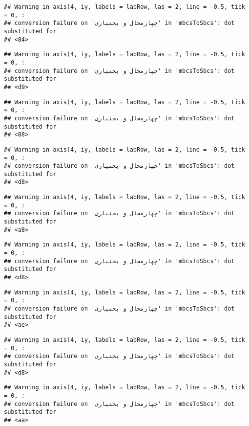 \documentclass[
]{article}
\begin{document}
\begin{verbatim}
## Warning in axis(4, iy, labels = labRow, las = 2, line = -0.5, tick = 0, :
## conversion failure on 'چهارمحال و بختیاری' in 'mbcsToSbcs': dot substituted for
## <84>
\end{verbatim}

\begin{verbatim}
## Warning in axis(4, iy, labels = labRow, las = 2, line = -0.5, tick = 0, :
## conversion failure on 'چهارمحال و بختیاری' in 'mbcsToSbcs': dot substituted for
## <d9>
\end{verbatim}

\begin{verbatim}
## Warning in axis(4, iy, labels = labRow, las = 2, line = -0.5, tick = 0, :
## conversion failure on 'چهارمحال و بختیاری' in 'mbcsToSbcs': dot substituted for
## <88>
\end{verbatim}

\begin{verbatim}
## Warning in axis(4, iy, labels = labRow, las = 2, line = -0.5, tick = 0, :
## conversion failure on 'چهارمحال و بختیاری' in 'mbcsToSbcs': dot substituted for
## <d8>
\end{verbatim}

\begin{verbatim}
## Warning in axis(4, iy, labels = labRow, las = 2, line = -0.5, tick = 0, :
## conversion failure on 'چهارمحال و بختیاری' in 'mbcsToSbcs': dot substituted for
## <a8>
\end{verbatim}

\begin{verbatim}
## Warning in axis(4, iy, labels = labRow, las = 2, line = -0.5, tick = 0, :
## conversion failure on 'چهارمحال و بختیاری' in 'mbcsToSbcs': dot substituted for
## <d8>
\end{verbatim}

\begin{verbatim}
## Warning in axis(4, iy, labels = labRow, las = 2, line = -0.5, tick = 0, :
## conversion failure on 'چهارمحال و بختیاری' in 'mbcsToSbcs': dot substituted for
## <ae>
\end{verbatim}

\begin{verbatim}
## Warning in axis(4, iy, labels = labRow, las = 2, line = -0.5, tick = 0, :
## conversion failure on 'چهارمحال و بختیاری' in 'mbcsToSbcs': dot substituted for
## <d8>
\end{verbatim}

\begin{verbatim}
## Warning in axis(4, iy, labels = labRow, las = 2, line = -0.5, tick = 0, :
## conversion failure on 'چهارمحال و بختیاری' in 'mbcsToSbcs': dot substituted for
## <aa>
\end{verbatim}
\end{document}
